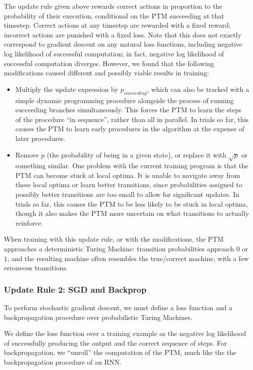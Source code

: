 \documentclass{article}
\begin{document}
The update rule given above rewards correct actions in proportion to the probability of their execution, conditional on the PTM succeeding at that timestep. Correct actions at any timestep are rewarded with a fixed reward; incorrect actions are punished with a fixed loss. Note that this does not exactly correspond to gradient descent on any natural loss functions, including negative log likelihood of successful computation; in fact, negative log likelihood of successful computation diverges. However, we found that the following modifications caused different and possibly viable results in training:
\begin{itemize}
    \item Multiply the update expression by $p_{succeeding}$, which can also be tracked with a simple dynamic programming procedure alongside the process of running succeeding branches simultaneously. This forces the PTM to learn the steps of the procedure ``in sequence'', rather than all in parallel. In trials so far, this causes the PTM to learn early procedures in the algorithm at the expense of later procedures.
    \item Remove $p$ (the probability of being in a given state), or replace it with $\sqrt{p}$ or something similar. One problem with the current training program is that the PTM can become stuck at local optima. It is unable to navigate away from these local optima or learn better transitions, since probabilities assigned to possibly better transitions are too small to allow for significant updates. In trials so far, this causes the PTM to be less likely to be stuck in local optima, though it also makes the PTM more uncertain on what transitions to actually reinforce.
\end{itemize}
When training with this update rule, or with the modifications, the PTM approaches a deterministic Turing Machine: transition probabilities approach $0$ or $1$, and the resulting machine often resembles the true/correct machine, with a few erroneous transitions.

\subsubsection{Update Rule 2: SGD and Backprop}
To perform stochastic gradient descent, we must define a loss function and a backpropagation procedure over probabilistic Turing Machines. 

We define the loss function over a training example as the negative log likelihood of successfully producing the output and the correct sequence of steps. For backpropagation, we ``unroll'' the computation of the PTM, much like the the backpropagation procedure of an RNN.        
\end{document}
